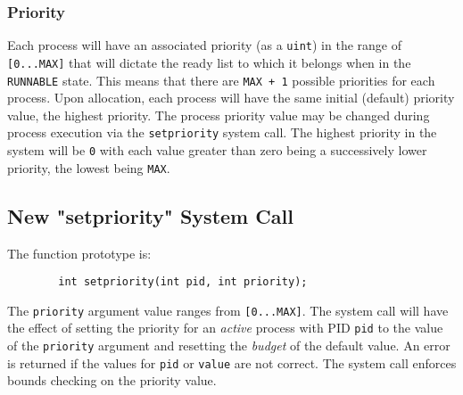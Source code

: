 \documentclass[11pt,letterpaper]{report}
\begin{document}
	\subsubsection{Priority}
	\indent
	Each process will have an associated priority (as a {\tt uint}) in the range of {\tt [0...MAX]} that will dictate the ready list to which it belongs when in the {\tt RUNNABLE} state. This means that there are {\tt MAX + 1} possible priorities for each process. Upon allocation, each process will have the same initial (default) priority value, the highest priority. The process priority value may be changed during process execution via the {\tt setpriority} system call. The highest priority in the system will be {\tt 0} with each value greater than zero being a successively lower priority, the lowest being {\tt MAX}.
	
	\subsection{New "setpriority" System Call}
	The function prototype is:
	\begin{verbatim}
		int setpriority(int pid, int priority);
	\end{verbatim}
	
	The {\tt priority} argument value ranges from {\tt [0...MAX]}. The system call will have the effect of setting the priority for an \emph{active} process with PID {\tt pid} to the value of the {\tt priority} argument and resetting the \emph{budget} of the default value. An error is returned if the values for {\tt pid} or {\tt value} are not correct. The system call enforces bounds checking on the priority value. 
	
\end{document}
